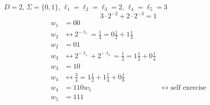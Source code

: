 \documentclass[mfit.tex]{subfiles}
\begin{document}
\begin{ex}
  $D = 2$, $\Sigma = \{0,1\}$, $\ell_1 = \ell_2 = \ell_3 = 2$, $\ell_4 = \ell_5 = 3$
  \[ 3 \cdot 2^{-2} + 2 \cdot 2^{-3} = 1 \]
  \begin{align*}
    w_1 &= 00 \\
    w_2 &\leftrightarrow 2^{-\ell_1} = \frac{1}{4} = 0 \frac{1}{2} + 1 \frac{1}{4} \\
    w_2 &= 01 \\
    w_3 &\leftrightarrow 2^{-\ell_1} + 2^{-\ell_2} = \frac{1}{2} = 1 \frac{1}{2} + 0 \frac{1}{4}\\
    w_3 &= 10\\
    w_4 &\leftrightarrow \frac{3}{4} = 1 \frac{1}{2} + 1 \frac{1}{4} + 0 \frac{1}{8} \\
    w_4 &= 110
    w_5 &\leftrightarrow \text{ self exercise}\\
    w_5 &= 111
  \end{align*}
\end{ex}
\end{document}
